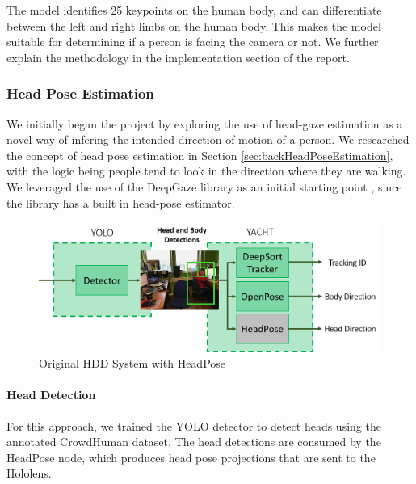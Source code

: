 The model identifies 25 keypoints on the human body, and can differentiate between the left and right limbs on the human body. This makes the model suitable for determining if a person is facing the camera or not. We further explain the methodology in the implementation section of the report.

\subsubsection{Head Pose Estimation}
We initially began the project by exploring the use of head-gaze estimation as a novel way of infering the intended direction of motion of a person. We researched the concept of head pose estimation in Section \ref{sec:backHeadPoseEstimation}, with the logic being people tend to look in the direction where they are walking. We leveraged the use of the DeepGaze library as an initial starting point \cite{Patacchiola2017a}, since the library has a built in head-pose estimator. 

\begin{figure}[ht]
	\centering
	\includegraphics[width=1.0\linewidth]{img/chapter4_analysis/hddSystemHeadPose.png}
	\caption{Original HDD System with HeadPose}
	\label{fig:headPoseHDD}
	\vspace{-1\baselineskip}
\end{figure}

\paragraph{Head Detection} For this approach, we trained the YOLO detector to detect heads using the annotated CrowdHuman dataset. The head detections are consumed by the HeadPose node, which produces head pose projections that are sent to the Hololens.

